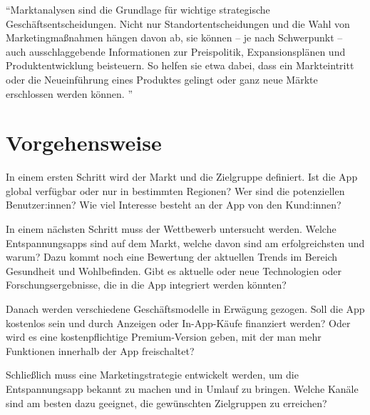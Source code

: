 "`Marktanalysen sind die Grundlage für wichtige strategische Geschäftsentscheidungen. 
Nicht nur Standortentscheidungen und die Wahl von Marketingmaßnahmen hängen davon ab, sie können – je nach 
Schwerpunkt – auch ausschlaggebende Informationen zur Preispolitik, Expansionsplänen und Produktentwicklung 
beisteuern. So helfen sie etwa dabei, dass ein Markteintritt oder die Neueinführung eines Produktes gelingt
oder ganz neue Märkte erschlossen werden können. "'
\cite{marktanalyse}

\section{Vorgehensweise}

In einem ersten Schritt wird der Markt und die Zielgruppe definiert. 
Ist die App global verfügbar oder nur in bestimmten Regionen? Wer sind die potenziellen Benutzer:innen?
Wie viel Interesse besteht an der App von den Kund:innen?

In einem nächsten Schritt muss der Wettbewerb untersucht werden.
Welche Entspannungsapps sind auf dem Markt, welche davon sind am erfolgreichsten und warum?
Dazu kommt noch eine Bewertung der aktuellen Trends im Bereich Gesundheit und Wohlbefinden. 
Gibt es aktuelle oder neue Technologien oder Forschungsergebnisse, die in die App integriert werden könnten?

Danach werden verschiedene Geschäftsmodelle in Erwägung gezogen. 
Soll die App kostenlos sein und durch Anzeigen oder In-App-Käufe finanziert werden? 
Oder wird es eine kostenpflichtige Premium-Version geben, mit der man mehr Funktionen innerhalb der App freischaltet?

Schließlich muss eine Marketingstrategie entwickelt werden, um die Entspannungsapp bekannt zu machen und
in Umlauf zu bringen. 
Welche Kanäle sind am besten dazu geeignet, die gewünschten Zielgruppen zu erreichen?


